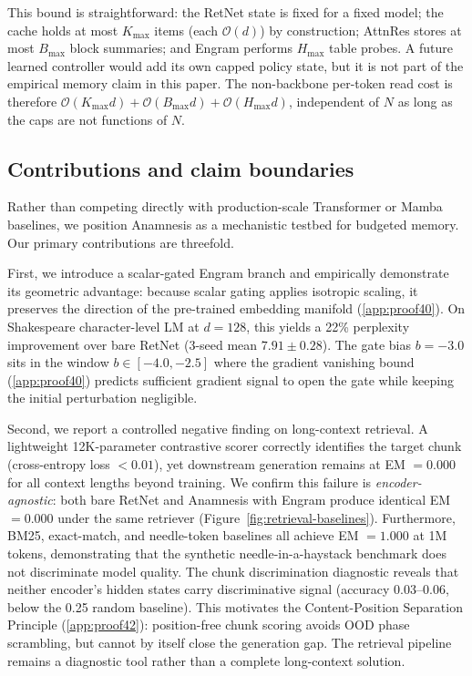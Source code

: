 \documentclass[preprint,12pt]{elsarticle}
\newcommand{\Oh}{\mathcal{O}}
\begin{document}
This bound is straightforward: the RetNet state is fixed for a fixed model; the cache holds at most $K_{\max}$ items (each $\Oh(d)$) by construction; AttnRes stores at most $B_{\max}$ block summaries; and Engram performs $H_{\max}$ table probes. A future learned controller would add its own capped policy state, but it is not part of the empirical memory claim in this paper. The non-backbone per-token read cost is therefore $\Oh(K_{\max}d) + \Oh(B_{\max}d) + \Oh(H_{\max}d)$, independent of $N$ as long as the caps are not functions of $N$.

\subsection{Contributions and claim boundaries}

Rather than competing directly with production-scale Transformer or Mamba baselines, we position Anamnesis as a mechanistic testbed for budgeted memory. Our primary contributions are threefold.

First, we introduce a scalar-gated Engram branch and empirically demonstrate its geometric advantage: because scalar gating applies isotropic scaling, it preserves the direction of the pre-trained embedding manifold (\ref{app:proof40}). On Shakespeare character-level LM at $d=128$, this yields a 22\% perplexity improvement over bare RetNet (3-seed mean $7.91 \pm 0.28$). The gate bias $b=-3.0$ sits in the window $b \in [-4.0, -2.5]$ where the gradient vanishing bound (\ref{app:proof40}) predicts sufficient gradient signal to open the gate while keeping the initial perturbation negligible.

Second, we report a controlled negative finding on long-context retrieval. A lightweight 12K-parameter contrastive scorer correctly identifies the target chunk (cross-entropy loss $< 0.01$), yet downstream generation remains at EM $= 0.000$ for all context lengths beyond training. We confirm this failure is \emph{encoder-agnostic}: both bare RetNet and Anamnesis with Engram produce identical EM $= 0.000$ under the same retriever (Figure~\ref{fig:retrieval-baselines}). Furthermore, BM25, exact-match, and needle-token baselines all achieve EM $= 1.000$ at 1M tokens, demonstrating that the synthetic needle-in-a-haystack benchmark does not discriminate model quality. The chunk discrimination diagnostic reveals that neither encoder's hidden states carry discriminative signal (accuracy 0.03--0.06, below the 0.25 random baseline). This motivates the Content-Position Separation Principle (\ref{app:proof42}): position-free chunk scoring avoids OOD phase scrambling, but cannot by itself close the generation gap. The retrieval pipeline remains a diagnostic tool rather than a complete long-context solution.
\end{document}
